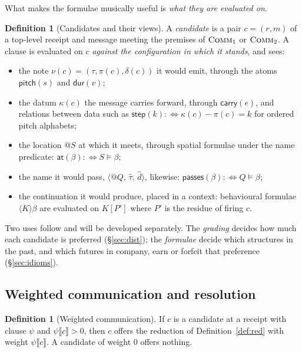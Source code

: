 \documentclass[11pt,a4paper]{article}
\makeatletter
\theoremstyle{plain}
\theoremstyle{definition}
\newtheorem{definition}[theorem]{Definition}
\theoremstyle{remark}
\let\oldsc\textsc
\renewcommand{\textsc}[1]{\textup{\oldsc{#1}}}
\newcommand{\nm}[3]{\langle @#1,\,#2,\,#3\rangle}
\newcommand{\atm}[1]{\mathsf{#1}}
\makeatother
\begin{document}
What makes the formulae musically useful is \emph{what they are evaluated on}.

\begin{definition}[Candidates and their views]\label{def:cand}
A \emph{candidate} is a pair $c = (r, m)$ of a top-level receipt and message
meeting the premises of $\textsc{Comm}_1$ or $\textsc{Comm}_2$. A clause is
evaluated on $c$ \emph{against the configuration in which it stands}, and sees:
\begin{itemize}[itemsep=1pt]
\item the note $\nu(c) = (\tau,\pi(c),\delta(c))$ it would emit, through the
  atoms $\atm{pitch}(s)$ and $\atm{dur}(v)$;
\item the datum $\kappa(c)$ the message carries forward, through
  $\atm{carry}(e)$, and relations between data such as
  $\atm{step}(k) :\Leftrightarrow \kappa(c) - \pi(c) = k$ for ordered pitch
  alphabets;
\item the location $@S$ at which it meets, through spatial formulae under the
  name predicate: $\atm{at}(\beta) :\Leftrightarrow S \models \beta$;
\item the name it would pass, $\nm{Q}{\hat\tau}{\hat d}$, likewise:
  $\atm{passes}(\beta) :\Leftrightarrow Q \models \beta$;
\item the continuation it would produce, placed in a context: behavioural
  formulae $\langle K\rangle\beta$ are evaluated on $K[P']$ where $P'$ is the
  residue of firing $c$.
\end{itemize}
\end{definition}

Two uses follow and will be developed separately. The \emph{grading} decides how
much each candidate is preferred (\S\ref{sec:dist}); the \emph{formulae} decide
which structures in the past, and which futures in company, earn or forfeit
that preference (\S\ref{sec:idioms}).

\subsection{Weighted communication and resolution}

\begin{definition}[Weighted communication]\label{def:wcomm}
If $c$ is a candidate at a receipt with clause $\psi$ and
$\psi\llbracket c\rrbracket > 0$, then $c$ offers the reduction of
Definition~\ref{def:red} with weight $\psi\llbracket c\rrbracket$. A candidate
of weight $0$ offers nothing.
\end{definition}
\end{document}
